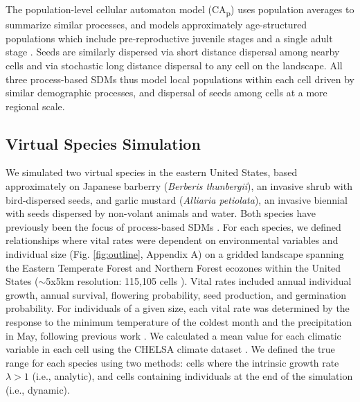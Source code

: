 \documentclass[preprint,review,times,12pt]{elsarticle}
\begin{document}
The population-level cellular automaton model (CA\textsubscript{p}) uses population averages to summarize similar processes, and models approximately age-structured populations which include pre-reproductive juvenile stages and a single adult stage \citep{Merow2011a,Szewczyk2019}. Seeds are similarly dispersed via short distance dispersal among nearby cells and via stochastic long distance dispersal to any cell on the landscape. All three process-based SDMs thus model local populations within each cell driven by similar demographic processes, and dispersal of seeds among cells at a more regional scale.

\subsection{Virtual Species Simulation}
We simulated two virtual species in the eastern United States, based approximately on Japanese barberry (\emph{Berberis thunbergii}), an invasive shrub with bird-dispersed seeds, and garlic mustard (\emph{Alliaria petiolata}), an invasive biennial with seeds dispersed by non-volant animals and water. Both species have previously been the focus of process-based SDMs \citep{Merow2017}. For each species, we defined relationships where vital rates were dependent on environmental variables and individual size (Fig. \ref{fig:outline}, Appendix A) on a gridded landscape spanning the Eastern Temperate Forest and Northern Forest ecozones within the United States ($\sim$5x5km resolution: 115,105 cells \citep{Omernik2014}). Vital rates included annual individual growth, annual survival, flowering probability, seed production, and germination probability. For individuals of a given size, each vital rate was determined by the response to the minimum temperature of the coldest month and the precipitation in May, following previous work \citep{Merow2017}. We calculated a mean value for each climatic variable in each cell using the CHELSA climate dataset \citep{Karger2017}. We defined the true range for each species using two methods: cells where the intrinsic growth rate $\lambda>1$ (i.e., analytic), and cells containing individuals at the end of the simulation (i.e., dynamic).
\end{document}

